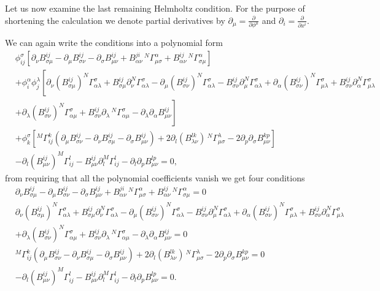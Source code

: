 \documentclass[english]{article}
\begin{document}
Let us now examine the last remaining Helmholtz condition. For the purpose of shortening the calculation we denote partial derivatives by $\partial_\mu=\frac{\partial}{\partial \phi^\mu}$ and $\partial_i=\frac{\partial}{\partial x^i}$.

We can again write the conditions into a polynomial form
\begin{align*}
&\phi^\sigma_{ij}\left[\partial_\nu B^{ij}_{\sigma\mu}-\partial_\mu B^{ij}_{\sigma\nu}-\partial_\sigma B^{ij}_{\mu\nu}+B^{ji}_{\alpha\nu}\, ^N\Gamma^\alpha_{\mu\sigma}+B^{ij}_{\alpha\nu}\, ^N\Gamma^\alpha_{\sigma\mu}\right]\\
&+\phi^\alpha_i\phi^\lambda_j\left[\partial_\nu (B^{ij}_{\sigma\mu})^N\Gamma^\sigma_{\alpha\lambda}+B^{ij}_{\sigma\mu}\partial_\nu^N\Gamma^\sigma_{\alpha\lambda}-\partial_\mu(B^{ij}_{\sigma\nu})^N\Gamma^\sigma_{\alpha\lambda}-B^{ij}_{\sigma\nu}\partial_\mu^N\Gamma^\sigma_{\alpha\lambda}+\partial_\alpha(B^{ij}_{\sigma\nu})^N\Gamma^\sigma_{\mu\lambda}+B^{ij}_{\sigma\nu}\partial_\alpha^N\Gamma^\sigma_{\mu\lambda}\right.\\
&\left.+\partial_\lambda(B^{ij}_{\sigma\nu})^N\Gamma^\sigma_{\alpha\mu}+B^{ij}_{\sigma\nu}\partial_\lambda\,^N\Gamma^\sigma_{\alpha\mu}-\partial_\lambda\partial_\alpha B^{ij}_{\mu\nu}\right]\\
&+\phi^\sigma_k\left[^M\Gamma^k_{ij}\left(\partial_\mu B^{ij}_{\sigma\nu}-\partial_\nu B^{ij}_{\sigma\mu}-\partial_\sigma B^{ij}_{\mu\nu}\right)
+2\partial_l\left(B^{lk}_{\lambda\nu}\right)\,^N\Gamma_{\mu\sigma}^\lambda-2\partial_p\partial_\sigma B^{kp}_{\mu\nu}\right]\\
&-\partial_l(B^{ij}_{\mu\nu})^M\Gamma^l_{ij}-B^{ij}_{\mu\nu}\partial_l^M\Gamma^l_{ij}-\partial_l\partial_pB^{lp}_{\mu\nu}=0,
\end{align*}
from requiring that all the polynomial coefficients vanish we get four conditions 
\begin{align}
\label{HP31}
&\partial_\nu B^{ij}_{\sigma\mu}-\partial_\mu B^{ij}_{\sigma\nu}-\partial_\sigma B^{ij}_{\mu\nu}+B^{ji}_{\alpha\nu}\, ^N\Gamma^\alpha_{\mu\sigma}+B^{ij}_{\alpha\nu}\, ^N\Gamma^\alpha_{\sigma\mu}=0\\
\nonumber
&\partial_\nu (B^{ij}_{\sigma\mu})^N\Gamma^\sigma_{\alpha\lambda}+B^{ij}_{\sigma\mu}\partial_\nu^N\Gamma^\sigma_{\alpha\lambda}-\partial_\mu(B^{ij}_{\sigma\nu})^N\Gamma^\sigma_{\alpha\lambda}-B^{ij}_{\sigma\nu}\partial_\mu^N\Gamma^\sigma_{\alpha\lambda}+\partial_\alpha(B^{ij}_{\sigma\nu})^N\Gamma^\sigma_{\mu\lambda}+B^{ij}_{\sigma\nu}\partial_\alpha^N\Gamma^\sigma_{\mu\lambda}\\
\label{HP32}
&+\partial_\lambda(B^{ij}_{\sigma\nu})^N\Gamma^\sigma_{\alpha\mu}+B^{ij}_{\sigma\nu}\partial_\lambda\,^N\Gamma^\sigma_{\alpha\mu}-\partial_\lambda\partial_\alpha B^{ij}_{\mu\nu}=0\\
\label{HP33}
&^M\Gamma^k_{ij}\left(\partial_\mu B^{ij}_{\sigma\nu}-\partial_\nu B^{ij}_{\sigma\mu}-\partial_\sigma B^{ij}_{\mu\nu}\right)
+2\partial_l\left(B^{lk}_{\lambda\nu}\right)\,^N\Gamma_{\mu\sigma}^\lambda-2\partial_p\partial_\sigma B^{kp}_{\mu\nu}=0
\\
\label{HP34}
&-\partial_l(B^{ij}_{\mu\nu})^M\Gamma^l_{ij}-B^{ij}_{\mu\nu}\partial_l^M\Gamma^l_{ij}-\partial_l\partial_pB^{lp}_{\mu\nu}=0.
\end{align}
\end{document}
